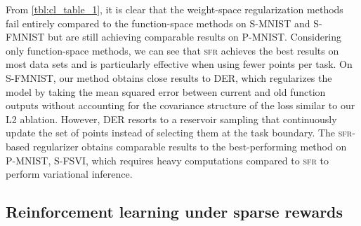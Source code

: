 \documentclass{article} %
\newcommand{\our}{\textsc{sfr}\xspace}
\begin{document}
From \cref{tbl:cl_table_1}, it is clear that the weight-space regularization methods fail entirely compared to the function-space methods on S-MNIST and S-FMNIST but are still achieving comparable results on P-MNIST.
Considering only function-space methods, we can see that \our achieves the best results on most data sets and is particularly effective when using fewer points per task.
On S-FMNIST, our method obtains close results to DER, which regularizes the model by taking the mean squared error between current and old function outputs without accounting for the covariance structure of the loss similar to our L2 ablation. However, DER resorts to a reservoir sampling \citep{vitter1985random} that continuously update the set of points instead of selecting them at the task boundary.
The \our-based regularizer obtains comparable results to the best-performing method on P-MNIST, S-FSVI, which requires heavy computations compared to \our to perform variational inference.





\subsection{Reinforcement learning under sparse rewards}
\label{sec:rl-exp}



\end{document}

